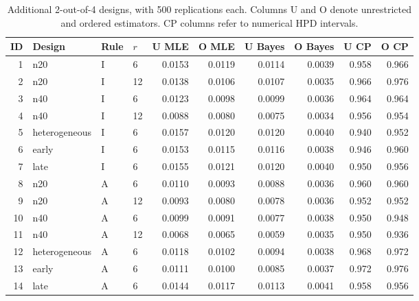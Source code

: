 \begin{table}[htbp]
\centering
\caption{Additional 2-out-of-4 designs, with 500 replications each. Columns U and O denote unrestricted and ordered estimators. CP columns refer to numerical HPD intervals.}\label{tab:design-extensions}
\small
\begin{tabular}{rlllrrrrrr}
\toprule
ID & Design & Rule & $r$ & U MLE & O MLE & U Bayes & O Bayes & U CP & O CP \\
\midrule
1 & n20 & I & 6 & 0.0153 & 0.0119 & 0.0114 & 0.0039 & 0.958 & 0.966 \\
2 & n20 & I & 12 & 0.0138 & 0.0106 & 0.0107 & 0.0035 & 0.966 & 0.976 \\
3 & n40 & I & 6 & 0.0123 & 0.0098 & 0.0099 & 0.0036 & 0.964 & 0.964 \\
4 & n40 & I & 12 & 0.0088 & 0.0080 & 0.0075 & 0.0034 & 0.956 & 0.954 \\
5 & heterogeneous & I & 6 & 0.0157 & 0.0120 & 0.0120 & 0.0040 & 0.940 & 0.952 \\
6 & early & I & 6 & 0.0153 & 0.0115 & 0.0116 & 0.0038 & 0.946 & 0.960 \\
7 & late & I & 6 & 0.0155 & 0.0121 & 0.0120 & 0.0040 & 0.950 & 0.956 \\
8 & n20 & A & 6 & 0.0110 & 0.0093 & 0.0088 & 0.0036 & 0.960 & 0.960 \\
9 & n20 & A & 12 & 0.0093 & 0.0080 & 0.0078 & 0.0036 & 0.952 & 0.952 \\
10 & n40 & A & 6 & 0.0099 & 0.0091 & 0.0077 & 0.0038 & 0.950 & 0.948 \\
11 & n40 & A & 12 & 0.0068 & 0.0065 & 0.0059 & 0.0035 & 0.950 & 0.936 \\
12 & heterogeneous & A & 6 & 0.0118 & 0.0102 & 0.0094 & 0.0038 & 0.968 & 0.972 \\
13 & early & A & 6 & 0.0111 & 0.0100 & 0.0085 & 0.0037 & 0.972 & 0.976 \\
14 & late & A & 6 & 0.0144 & 0.0117 & 0.0113 & 0.0041 & 0.958 & 0.956 \\
\bottomrule
\end{tabular}
\end{table}
